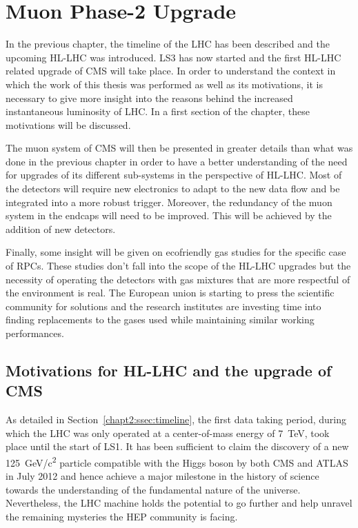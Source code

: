 \renewcommand\evenpagerightmark{{\scshape\small Chapter 3}}
\renewcommand\oddpageleftmark{{\scshape\small Muon Phase-2 Upgrade}}

\renewcommand{\bibname}{References}

\hyphenation{}

\chapter[Muon Phase-2 Upgrade]%
{Muon Phase-2 Upgrade}
\label{chapt:3}
		
	In the previous chapter, the timeline of the LHC has been described and the upcoming \acl{HL-LHC} was introduced. LS3 has now started and the first HL-LHC related upgrade of CMS will take place. In order to understand the context in which the work of this thesis was performed as well as its motivations, it is necessary to give more insight into the reasons behind the increased instantaneous luminosity of LHC. In a first section of the chapter, these motivations will be discussed.
	
	The muon system of CMS will then be presented in greater details than what was done in the previous chapter in order to have a better understanding of the need for upgrades of its different sub-systems in the perspective of HL-LHC. Most of the detectors will require new electronics to adapt to the new data flow and be integrated into a more robust trigger. Moreover, the redundancy of the muon system in the endcaps will need to be improved. This will be achieved by the addition of new detectors.
	
	Finally, some insight will be given on ecofriendly gas studies for the specific case of \acl{RPC}s. These studies don't fall into the scope of the HL-LHC upgrades but the necessity of operating the detectors with gas mixtures that are more respectful of the environment is real. The European union is starting to press the scientific community for solutions and the research institutes are investing time into finding replacements to the gases used while maintaining similar working performances.
	
\section{Motivations for HL-LHC and the upgrade of CMS}
\label{chapt3:sec:motivations}

	As detailed in Section~\ref{chapt2:ssec:timeline}, the first data taking period, during which the LHC was only operated at a center-of-mass energy of \SI{7}{TeV}, took place until the start of LS1. It has been sufficient to claim the discovery of a new \SI{125}{GeV/c^2} particle compatible with the Higgs boson by both CMS and ATLAS in July 2012 and hence achieve a major milestone in the history of science towards the understanding of the fundamental nature of the universe. Nevertheless, the LHC machine holds the potential to go further and help unravel the remaining mysteries the \acf{HEP} community is facing.
	
